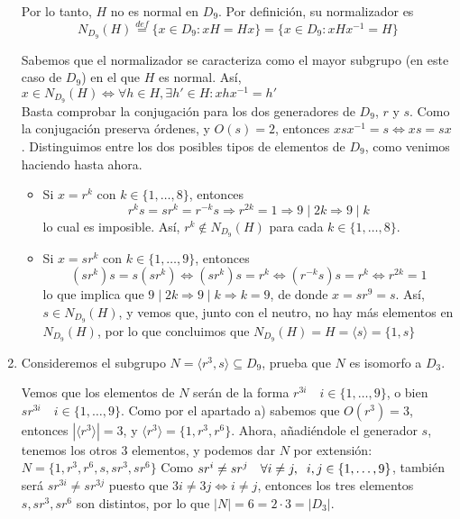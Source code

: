 \documentclass[12pt]{article}
\begin{document}
\begin{ejercicio}
\begin{enumerate}[label=(\alph*)]
            Por lo tanto, $H$ no es normal en $D_9$. Por definición, su normalizador es $$N_{D_9}(H) \stackrel{def}{=} \{x \in D_9 : xH = Hx\} = \{x \in D_9 : xHx^{-1} = H\}$$

            Sabemos que el normalizador se caracteriza como el mayor subgrupo (en este caso de $D_9$) en el que $H$ es normal. Así, $x \in N_{D_9}(H) \iff \forall h \in H, \exists h' \in H : xhx^{-1} = h'$ \\

            Basta comprobar la conjugación para los dos generadores de $D_9$, $r$ y $s$. Como la conjugación preserva órdenes, y $O(s) = 2$, entonces $xsx^{-1} = s \iff xs = sx$. Distinguimos entre los dos posibles tipos de elementos de $D_9$, como venimos haciendo hasta ahora.

            \begin{itemize}
                \item Si $x = r^k$ con $k \in \{1, \ldots, 8\}$, entonces $$r^k s = s r^k = r^{-k} s \Longrightarrow r^{2k} = 1 \Longrightarrow 9 \mid 2k \Longrightarrow 9 \mid k$$ lo cual es imposible. Así, $r^{k} \notin N_{D_9}(H)$ para cada $k \in \{1, \ldots, 8\}$.
                \item Si $x = sr^k$ con $k \in \{1, \ldots, 9\}$, entonces $$(sr^k)s = s(sr^k) \iff (sr^k)s = r^k \iff (r^{-k}s)s = r^k \iff r^{2k} = 1$$
                lo que implica que $9 \mid 2k \Longrightarrow 9 \mid k \Longrightarrow k=9$, de donde $x = sr^9 = s$. Así, $s \in N_{D_9}(H)$, y vemos que, junto con el neutro, no hay más elementos en $N_{D_9}(H)$, por lo que concluimos que $N_{D_9}(H) = H = \langle s \rangle = \{1,s\}$
             \end{itemize}

            \item Consideremos el subgrupo $N = \langle r^3, s \rangle \subseteq D_9$, prueba que $N$ es isomorfo a $D_3$.
            
            Vemos que los elementos de $N$ serán de la forma $r^{3i} \quad i \in \{1, \ldots, 9\}$, o bien $sr^{3i} \quad i \in \{1, \ldots, 9\}$. Como por el apartado a) sabemos que $O(r^3) = 3$, entonces $|\langle r^3 \rangle| = 3$, y $\langle r^3 \rangle = \{1, r^3, r^6\}$. Ahora, añadiéndole
            el generador $s$, tenemos los otros $3$ elementos, y podemos dar $N$ por extensión: $N = \{1, r^3, r^6, s, sr^3, sr^6\}$ Como $sr^{i} \neq sr^j \quad \forall i\neq j, \hspace{0.2cm} i,j \in \{1, \ldots, 9\}$, también será $sr^{3i} \neq sr^{3j}$ puesto que $3i \neq 3j \iff i \neq j$, 
            entonces los tres elementos $s, sr^3, sr^6$ son distintos, por lo que $|N| = 6 = 2 \cdot 3 = |D_3|$. \\


\end{enumerate}
\end{ejercicio}
\end{document}
